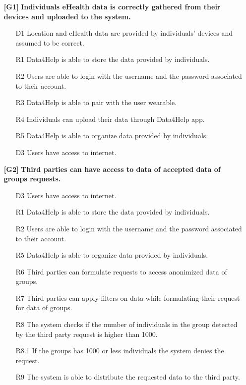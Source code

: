 \begin{enumerate}

\item[\textbf{[G1]}] \textbf{Individuals eHealth data is correctly gathered from their devices and uploaded to the system.}

\begin{enumerate}

\item[D1] Location and eHealth data are provided by individuals' devices and assumed to be correct.
\item[R1] Data4Help is able to store the data provided by individuals.
\item[R2] Users are able to login with the username and the password associated to their account.
\item[R3] Data4Help is able to pair with the user wearable.
\item[R4] Individuals can upload their data through Data4Help app.
\item[R5] Data4Help is able to organize data provided by individuals.
\item[D3] Users have access to internet.



\end{enumerate}

\item[\textbf{[G2]}] \textbf{Third parties can have access to data of accepted data of groups requests.}

\begin{enumerate}

\item[D3] Users have access to internet.
\item[R1] Data4Help is able to store the data provided by individuals.
\item[R2] Users are able to login with the username and the password associated to their account.
\item[R5] Data4Help is able to organize data provided by individuals.
\item[R6] Third parties can formulate requests to access anonimized data of groups.
\item[R7] Third parties can apply filters on data while formulating their request for data of groups.
\item[R8] The system checks if the number of individuals in the group detected by the third party request is higher than 1000.
\item[R8.1] If the groups has 1000 or less individuals the system denies the request.
\item[R9] The system is able to distribute the requested data to the third party.




\end{enumerate}
\end{enumerate}

